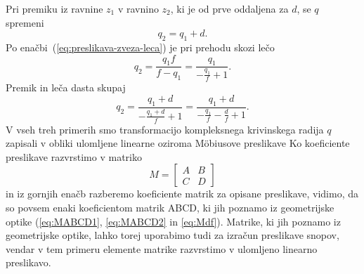 Pri premiku iz ravnine $z_1$ v ravnino $z_2$, ki je od prve oddaljena
za $d$, se $q$ spremeni 
\begin{equation}
q_2=q_1+d.
\end{equation}
Po enačbi~(\ref{eq:preslikava-zveza-leca}) je pri prehodu skozi lečo
\begin{equation}
q_2=\frac{q_1f}{f-q_1}=\frac{q_1}{-\frac{q_1}{f}+1}.
\end{equation}
Premik in leča dasta skupaj
\begin{equation}
q_2=\frac{q_1+d}{-\frac{q_1+d}{f}+1}=\frac{q_1+d}{-\frac{q_1}{f}-\frac{d}{f}+1}.
\label{eq:premikleca}
\end{equation}
V vseh treh primerih smo transformacijo kompleksnega krivinskega radija 
$q$ zapisali v obliki ulomljene linearne oziroma M\"obiusove 
preslikave
Ko koeficiente preslikave razvrstimo v matriko 
\begin{equation}
M= \left[\begin{array}{cc}
A & B\\
C & D
\end{array}\right]
\end{equation}
in iz gornjih enačb razberemo koeficiente matrik  za opisane 
preslikave, vidimo, da so povsem enaki koeficientom matrik ABCD, ki jih poznamo iz
geometrijske optike (\ref{eq:MABCD1}, \ref{eq:MABCD2} in \ref{eq:Mdf}). Matrike, ki jih
poznamo iz geometrijske optike, lahko torej uporabimo tudi za izračun preslikave snopov,
vendar v tem primeru elemente matrike razvrstimo v ulomljeno linearno preslikavo.

